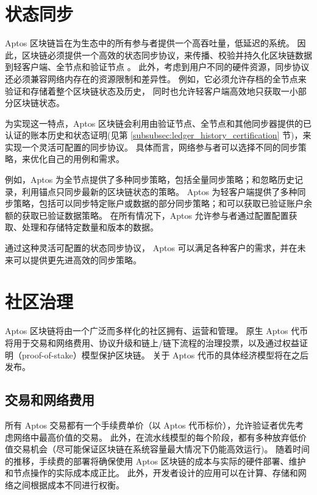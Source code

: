 \documentclass{article}
\begin{document}
\section{状态同步}
\label{sub:state_sync}

Aptos 区块链旨在为生态中的所有参与者提供一个高吞吐量，低延迟的系统。 因此，区块链必须提供一个高效的状态同步协议，来传播、校验并持久化区块链数据到轻客户端、全节点和验证节点 \cite{evolution_state_sync}。 此外，考虑到用户不同的硬件资源，同步协议还必须兼容网络内存在的资源限制和差异性。 例如，它必须允许存档的全节点来验证和存储着整个区块链状态及历史， 同时也允许轻客户端高效地只获取一小部分区块链状态。

为实现这一特点，Aptos 区块链会利用由验证节点、全节点和其他同步器提供的已认证的账本历史和状态证明(见第 \ref{subsubsec:ledger_history_certification} 节)，来实现一个灵活可配置的同步协议。 具体而言，网络参与者可以选择不同的同步策略，来优化自己的用例和需求。

例如，Aptos 为全节点提供了多种同步策略，包括全量同步策略；和忽略历史记录，利用锚点只同步最新的区块链状态的策略。 Aptos 为轻客户端提供了多种同步策略，包括可以同步特定账户或数据的部分同步策略；和可以获取已验证账户余额的获取已验证数据策略。 在所有情况下，Aptos 允许参与者通过配置配置获取、处理和存储特定数量和版本的数据。

通过这种灵活可配置的状态同步协议， Aptos 可以满足各种客户的需求，并在未来可以提供更先进高效的同步策略。

\section{社区治理}
\label{sec:community_ownership}

Aptos 区块链将由一个广泛而多样化的社区拥有、运营和管理。 原生 Aptos 代币将用于交易和网络费用、协议升级和链上/链下流程的治理投票，以及通过权益证明（proof-of-stake）模型保护区块链。 关于 Aptos 代币的具体经济模型将在之后发布。

\subsection{交易和网络费用}
\label{subsec:network_fees}

所有 Aptos 交易都有一个手续费单价（以 Aptos 代币标价），允许验证者优先考虑网络中最高价值的交易。 此外，在流水线模型的每个阶段，都有多种放弃低价值交易机会（尽可能保证区块链在系统容量最大情况下仍能高效运行)。 随着时间的推移，手续费的部署将确保使用 Aptos 区块链的成本与实际的硬件部署、维护和节点操作的实际成本成正比。 此外，开发者设计的应用可以在计算、存储和网络之间根据成本不同进行权衡。
\end{document}
